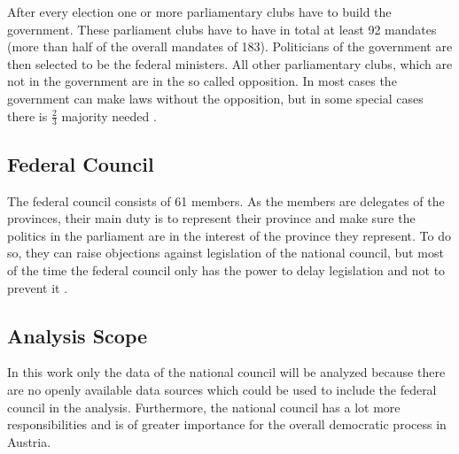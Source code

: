 After every election one or more parliamentary clubs have to build the government. These parliament clubs have to have in total at least 92 mandates (more than half of the overall mandates of 183). Politicians of the government are then selected to be the federal ministers. All other parliamentary clubs, which are not in the government are in the so called opposition. In most cases the government can make laws without the opposition, but in some special cases there is $\frac{2}{3}$ majority needed \cite{AustrianParliament_2015}.

\subsection{Federal Council}
The federal council consists of 61 members. As the members are delegates of the provinces, their main duty is to represent their province and make sure the politics in the parliament are in the interest of the province they represent. To do so, they can raise objections against legislation of the national council, but most of the time the federal council only has the power to delay legislation and not to prevent it \cite{AustrianParliament_2015}.

\subsection{Analysis Scope}
In this work only the data of the national council will be analyzed because there are no openly available data sources which could be used to include the federal council in the analysis. Furthermore, the national council has a lot more responsibilities and is of greater importance for the overall democratic process in Austria.